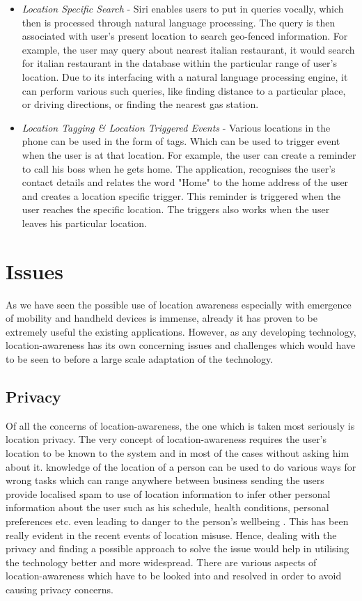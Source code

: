 \documentclass[12pt]{report}
\begin{document}
\begin{itemize}
\item \textit{Location Specific Search} - Siri enables users to put in queries vocally, which then is processed through natural language processing. The query is then associated with user's present location to search geo-fenced information. For example, the user may query about nearest italian restaurant, it would search for italian restaurant in the database within the particular range of user's location. Due to its interfacing with a natural language processing engine, it can perform various such queries, like finding distance to a particular place, or driving directions, or finding the nearest gas station.

\item \textit{Location Tagging \& Location Triggered Events} - Various locations in the phone can be used in the form of tags. Which can be used to trigger event when the user is at that location. For example, the user can create a reminder to call his boss when he gets home. The application, recognises the user's contact details and relates the word "Home" to the home address of the user and creates a location specific trigger. This reminder is triggered when the user reaches the specific location. The triggers also works when the user leaves his particular location.

\end{itemize}

\chapter{Issues}

As we have seen the possible use of location awareness especially with emergence of mobility and handheld devices is immense, already it has proven to be extremely useful the existing applications. However, as any developing technology, location-awareness has its own concerning issues and challenges which would have to be seen to before a large scale adaptation of the technology.

\section{Privacy}
Of all the concerns of location-awareness, the one which is taken most seriously is location privacy. The very concept of location-awareness requires the user's location to be known to the system and in most of the cases without asking him about it. knowledge of the location of a person can be used to do various ways for wrong tasks which can range anywhere between business sending the users provide localised spam to use of location information to infer other personal information about the user such as his schedule, health conditions, personal preferences etc. even leading to danger to the person's wellbeing \cite{duckham2006location}. This has been really evident in the recent events of location misuse. Hence, dealing with the privacy and finding a possible approach to solve the issue would help in utilising the technology better and more widespread. There are various aspects of location-awareness which have to be looked into and resolved in order to avoid causing privacy concerns.
\end{document}
